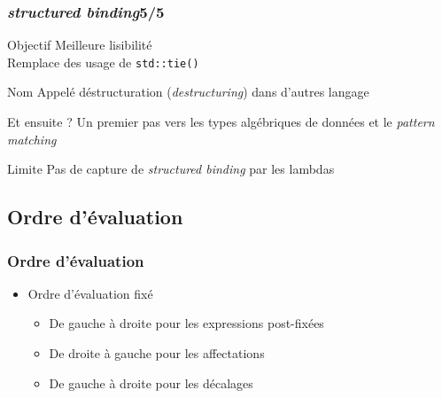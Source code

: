 \documentclass[C++.tex]{subfiles}
\begin{document}
\begin{frame}[fragile]
	\frametitle{\textit{structured binding}\titlehfill{}5/5}
	\begin{block}{Objectif}
		Meilleure lisibilité\\
		Remplace des usage de \lstinline|std::tie()|
	\end{block}

	\begin{block}{Nom}
		Appelé déstructuration (\textit{destructuring}) dans d'autres langage
	\end{block}

	\begin{block}{Et ensuite ?}
		Un premier pas vers les types algébriques de données et le \textit{pattern matching}
	\end{block}


	\begin{alertblock}{Limite}
		Pas de capture de \textit{structured binding} par les lambdas
	\end{alertblock}


\end{frame}

\subsection*{Ordre d'évaluation}
\begin{frame}[fragile]
	\frametitle{Ordre d'évaluation}
	\begin{itemize}
		\item Ordre d'évaluation fixé
		\begin{itemize}
			\item De gauche à droite pour les expressions post-fixées


			\item De droite à gauche pour les affectations
			\item De gauche à droite pour les décalages
		\end{itemize}
	\end{itemize}
\end{frame}
\end{document}
